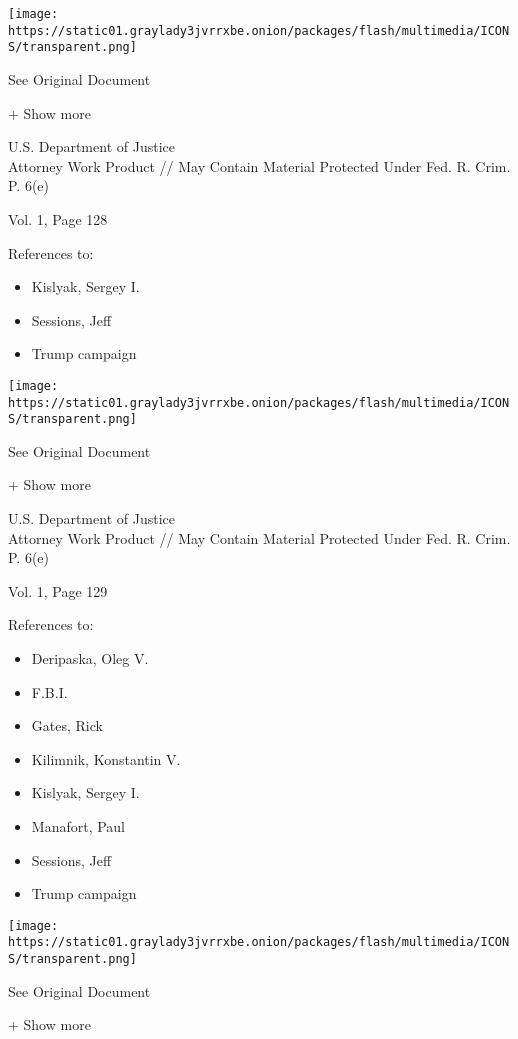 \protect\hyperlink{}{}

\texttt{[image: https://static01.graylady3jvrrxbe.onion/packages/flash/multimedia/ICONS/transparent.png]}

See Original Document

+ Show more

U.S. Department of Justice\\
Attorney Work Product // May Contain Material Protected Under Fed. R.
Crim. P. 6(e)

Vol. 1, Page 128

References to:

\begin{itemize}
\tightlist
\item
  Kislyak, Sergey I.
\item
  Sessions, Jeff
\item
  Trump campaign
\end{itemize}

\protect\hyperlink{}{}

\texttt{[image: https://static01.graylady3jvrrxbe.onion/packages/flash/multimedia/ICONS/transparent.png]}

See Original Document

+ Show more

U.S. Department of Justice\\
Attorney Work Product // May Contain Material Protected Under Fed. R.
Crim. P. 6(e)

Vol. 1, Page 129

References to:

\begin{itemize}
\tightlist
\item
  Deripaska, Oleg V.
\item
  F.B.I.
\item
  Gates, Rick
\item
  Kilimnik, Konstantin V.
\item
  Kislyak, Sergey I.
\item
  Manafort, Paul 
\item
  Sessions, Jeff
\item
  Trump campaign
\end{itemize}

\protect\hyperlink{}{}

\texttt{[image: https://static01.graylady3jvrrxbe.onion/packages/flash/multimedia/ICONS/transparent.png]}

See Original Document

+ Show more

